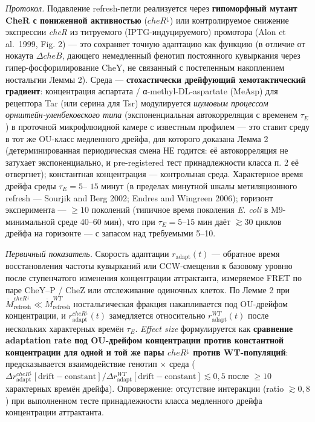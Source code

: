 \documentclass[pdflatex,sn-mathphys-ay]{sn-jnl}
\begin{document}
\emph{Протокол.} Подавление refresh-петли реализуется через \textbf{гипоморфный мутант CheR с пониженной активностью} (\(cheR^{\downarrow}\)) или контролируемое снижение экспрессии \emph{cheR} из титруемого (IPTG-индуцируемого) промотора (Alon et al.~1999, Fig. 2) --- это сохраняет точную адаптацию как функцию (в отличие от нокаута \(\Delta cheB\), дающего немедленный фенотип постоянного кувыркания через гипер-фосфорилирование CheY, не связанный с постепенным накоплением ностальгии Леммы 2). Среда --- \textbf{стохастически дрейфующий хемотактический градиент}: концентрация аспартата / α-methyl-DL-aspartate (MeAsp) для рецептора Tar (или серина для Tsr) модулируется \emph{шумовым процессом орнштейн-уленбековского типа} (экспоненциальная автокорреляция с временем \(\tau_E\)) в проточной микрофлюидной камере с известным профилем --- это ставит среду в тот же OU-класс медленного дрейфа, для которого доказана Лемма 2 (детерминированная периодическая смена НЕ годится: её автокорреляция не затухает экспоненциально, и pre-registered тест принадлежности класса п. 2 её отвергнет); константная концентрация --- контрольная среда. Характерное время дрейфа среды \(\tau_E = 5\)-- \(15\) минут (в пределах минутной шкалы метиляционного refresh --- Sourjik and Berg 2002; Endres and Wingreen 2006); горизонт эксперимента --- \(\ge 10\) поколений (типичное время поколения \emph{E. coli} в M9-минимальной среде 40--60 мин), что при \(\tau_E = 5\)--\(15\) мин даёт \(\gtrsim 30\) циклов дрейфа на горизонте --- с запасом над требуемыми 5--10.



\emph{Первичный показатель.} Скорость адаптации \(r_{\text{adapt}}(t)\) --- обратное время восстановления частоты кувырканий или CCW-смещения к базовому уровню после ступенчатого изменения концентрации аттрактанта, измеряемое FRET по паре CheY--P / CheZ или отслеживание одиночных клеток. По Лемме 2 при \(\dot M_{\text{refresh}}^{cheR^{\downarrow}} \ll \dot M_{\text{refresh}}^{WT}\) ностальгическая фракция накапливается под OU-дрейфом концентрации, и \(r_{\text{adapt}}^{cheR^{\downarrow}}(t)\) замедляется относительно \(r_{\text{adapt}}^{WT}(t)\) после нескольких характерных времён \(\tau_E\). \emph{Effect size} формулируется как \textbf{сравнение adaptation rate под OU-дрейфом концентрации против константной концентрации для одной и той же пары \(cheR^{\downarrow}\) против WT-популяций}: предсказывается взаимодействие генотип × среда (\(\Delta r_{\text{adapt}}^{cheR^{\downarrow}} [\text{drift} - \text{constant}] / \Delta r_{\text{adapt}}^{WT}[\text{drift} - \text{constant}] \lesssim 0{,}5\) после \(\ge 10\) характерных времён дрейфа). Опровержение: отсутствие интеракции (ratio \(\gtrsim 0{,}8\)) при выполненном тесте принадлежности класса медленного дрейфа концентрации аттрактанта.
\end{document}
